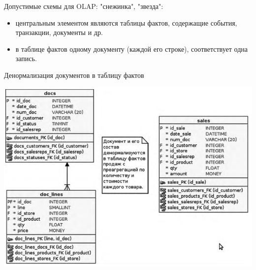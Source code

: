 \documentclass{beamer}
\begin{document}
\begin{frame}
Допустимые схемы для OLAP: "снежинка", "звезда":
\begin{itemize}
\item центральным элементом являются таблицы фактов, содержащие события, транзакции, документы и др.
\item в таблице фактов одному документу (каждой его строке), соответствует одна запись.
\end{itemize}
\begin{block}{Денормализация документов в таблицу фактов}
\begin{center}
\includegraphics[scale=0.4]{images/denorm.png}
\end{center}
\end{block}
\end{frame}
\end{document}
